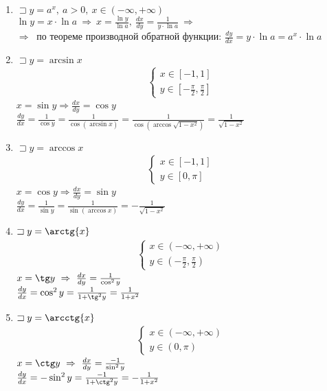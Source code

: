 \documentclass{article}
\begin{document}
\begin{enumerate}
	\item $\sqsupset y = a^x, \ a > 0, \ x \in (-\infty, +\infty)$ \\
	      $\ln y = x \cdot \ln a \ \Rightarrow \ x = \frac{\ln y}{\ln a}, \ \frac{dx}{dy} = \frac{1}{y \cdot \ln a} \ \Rightarrow$ \\
	      $\Rightarrow \ $ по теореме производной обратной функции: $\frac{dy}{dx} = y \cdot \ln a = a^x \cdot \ln a$

	\item $\sqsupset y = \arcsin{x}$ \\
	      \begin{align*}
		      \begin{cases}
			      x \in [-1, 1] \\
			      y \in [-\frac{\pi}{2}, \frac{\pi}{2}]
		      \end{cases}
	      \end{align*}
	      $x = \sin{y} \Rightarrow \frac{dx}{dy} = \cos{y}$ \\
	      $\frac{dy}{dx} = \frac{1}{\cos{y}} = \frac{1}{\cos{(\arcsin{x})}} = \frac{1}{\cos{(\arccos{\sqrt{1-x^2}})}} = \frac{1}{\sqrt{1-x^2}}$

	\item $\sqsupset y = \arccos{x}$
	      \begin{align*}
		      \begin{cases}
			      x \in [-1, 1] \\
			      y \in [0, \pi ]
		      \end{cases}
	      \end{align*}
	      $x = \cos{y} \Rightarrow \frac{dx}{dy} = \sin{y}$ \\
	      $\frac{dy}{dx} = \frac{1}{\sin{y}} = \frac{1}{\sin{(\arccos{x})}} = -\frac{1}{\sqrt{1-x^2}}$

	\item $\sqsupset y = \arctg{x}$ \\
	      \begin{align*}
		      \begin{cases}
			      x \in (-\infty, +\infty) \\
			      y \in (-\frac{\pi}{2}, \frac{\pi}{2})
		      \end{cases}
	      \end{align*}
	      $x = \tg y \ \Rightarrow \ \frac{dx}{dy} = \frac{1}{\cos^2{y}}$  \\
	      $\frac{dy}{dx} = \cos^2{y} = \frac{1}{1+\tg^2{y}} = \frac{1}{1+x^2}$

	\item $\sqsupset y = \arcctg{x}$
	      \begin{align*}
		      \begin{cases}
			      x \in (-\infty, +\infty) \\
			      y \in (0, \pi)
		      \end{cases}
	      \end{align*}
	      $x = \ctg y \ \Rightarrow \ \frac{dx}{dy} = \frac{-1}{\sin^2{y}}$  \\
	      $\frac{dy}{dx} = -\sin^2{y} = \frac{-1}{1+\ctg^2{y}} = -\frac{1}{1+x^2}$
\end{enumerate}
\end{document}
